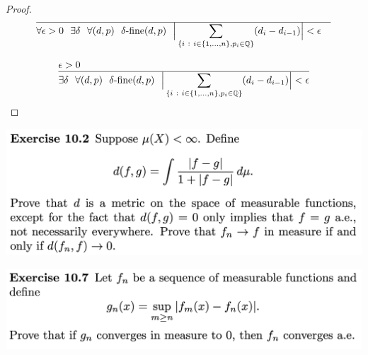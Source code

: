 \begin{proof}
  \begin{align*}
    \hline
    &\forall \epsilon > 0 ~~ \exists \delta ~~ \forall (d, p) ~~ \delta\text{-fine}(d, p) ~~ \Big|\sum_{\{i ~:~ i \in \{1, \ldots, n\}, p_i \in \mathbb{Q}\}} (d_i - d_{i-1})\Big| < \epsilon
  \end{align*}

\begin{align*}
  &\epsilon > 0 \\
  \hline
  &\exists \delta ~~ \forall (d, p) ~~ \delta\text{-fine}(d, p) ~~ \Big|\sum_{\{i ~:~ i \in \{1, \ldots, n\}, p_i \in \mathbb{Q}\}} (d_i - d_{i-1})\Big| < \epsilon
  \end{align*}
\end{proof}
\newpage
\begin{mdframed}
\includegraphics[width=400pt]{img/analysis--berkeley-202a-hw09-b4e1.png}
\end{mdframed}

\newpage
\begin{mdframed}
\includegraphics[width=400pt]{img/analysis--berkeley-202a-hw09-ea17.png}
\end{mdframed}